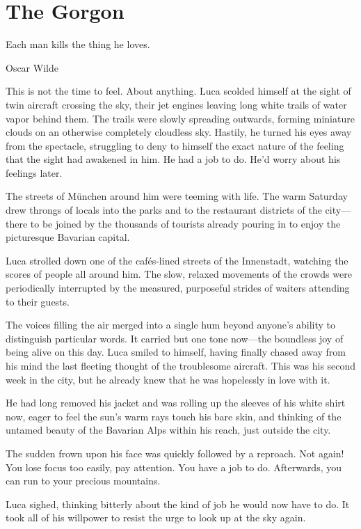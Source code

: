 \chapter{The Gorgon}

\epigraph{Each man kills the thing he loves.}{Oscar Wilde}

\firstparagraph

This is not the time to feel. About anything. Luca scolded himself at the sight of twin aircraft crossing the sky, their jet engines leaving long white trails of water vapor behind them. The trails were slowly spreading outwards, forming miniature clouds on an otherwise completely cloudless sky. Hastily, he turned his eyes away from the spectacle, struggling to deny to himself the exact nature of the feeling that the sight had awakened in him. He had a job to do. He'd worry about his feelings later.

The streets of München around him were teeming with life. The warm Saturday drew throngs of locals into the parks and to the restaurant districts of the city---there to be joined by the thousands of tourists already pouring in to enjoy the picturesque Bavarian capital.

Luca strolled down one of the cafés-lined streets of the Innenstadt, watching the scores of people all around him. The slow, relaxed movements of the crowds were periodically interrupted by the measured, purposeful strides of waiters attending to their guests.

The voices filling the air merged into a single hum beyond anyone's ability to distinguish particular words. It carried but one tone now---the boundless joy of being alive on this day. Luca smiled to himself, having finally chased away from his mind the last fleeting thought of the troublesome aircraft. This was his second week in the city, but he already knew that he was hopelessly in love with it.

He had long removed his jacket and was rolling up the sleeves of his white shirt now, eager to feel the sun's warm rays touch his bare skin, and thinking of the untamed beauty of the Bavarian Alps within his reach, just outside the city.

The sudden frown upon his face was quickly followed by a reproach. Not again! You lose focus too easily, pay attention. You have a job to do. Afterwards, you can run to your precious mountains.

Luca sighed, thinking bitterly about the kind of job he would now have to do. It took all of his willpower to resist the urge to look up at the sky again.

